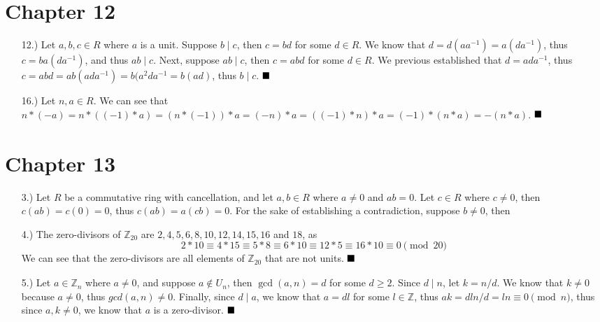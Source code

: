 \documentclass[11pt]{article}
\newcommand{\done}{
    \ensuremath{\strut\hfill\blacksquare}
}
\newcommand{\Z}{\mathbb{Z}}
\begin{document}
\pagestyle{fancy}
\fancyhead{}

\normalsize

\section*{Chapter 12}
\begin{itemize}
    \item [12.)] Let $a,b,c\in R$ where $a$ is a unit. Suppose $b\mid c$, then $c=bd$ for some $d\in R$. We know that $d=d(aa^{-1})=a(da^{-1})$, thus $c=ba(da^{-1})$, and thus $ab\mid c$. Next, suppose $ab\mid c$, then $c=abd$ for some $d\in R$. We previous established that $d=ada^{-1}$, thus $c=abd=ab(ada^{-1})=b(a^2da^{-1}=b(ad)$, thus $b\mid c$. \done

\item [16.)] Let $n,a\in R$. We can see that $n*(-a)=n*((-1)*a)=(n*(-1))*a=(-n)*a=((-1)*n)*a=(-1)*(n*a)=-(n*a)$. \done
\end{itemize}

\section*{Chapter 13}
\begin{itemize}
    \item [3.)] Let $R$ be a commutative ring with cancellation, and let $a,b\in R$ where $a\ne0$ and $ab=0$. Let $c\in R$ where $c\ne0$, then $c(ab)=c(0)=0$, thus $c(ab)=a(cb)=0$. For the sake of establishing a contradiction, suppose $b\ne0$, then 

    \item [4.)] The zero-divisors of $\Z_{20}$ are $2,4,5,6,8,10,12,14,15,16$ and $18$, as 
    \[2*10\equiv4*15\equiv5*8\equiv6*10\equiv12*5\equiv16*10\equiv0\pmod{20}\]
    We can see that the zero-divisors are all elements of $\Z_{20}$ that are not units. \done

    \item [5.)] Let $a\in\Z_n$ where $a\ne0$, and suppose $a\notin U_n$, then $\gcd(a,n)=d$ for some $d\geq2$. Since $d\mid n$, let $k=n/d$. We know that $k\ne0$ because $a\ne0$, thus $gcd(a,n)\ne0$. Finally, since $d\mid a$, we know that $a=dl$ for some $l\in\Z$, thus $ak=dln/d=ln\equiv0\pmod{n}$, thus since $a,k\ne0$, we know that $a$ is a zero-divisor. \done
\end{itemize}
\end{document}

